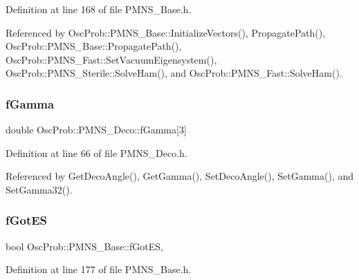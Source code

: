 Definition at line 168 of file P\+M\+N\+S\+\_\+\+Base.\+h.



Referenced by Osc\+Prob\+::\+P\+M\+N\+S\+\_\+\+Base\+::\+Initialize\+Vectors(), Propagate\+Path(), Osc\+Prob\+::\+P\+M\+N\+S\+\_\+\+Base\+::\+Propagate\+Path(), Osc\+Prob\+::\+P\+M\+N\+S\+\_\+\+Fast\+::\+Set\+Vacuum\+Eigensystem(), Osc\+Prob\+::\+P\+M\+N\+S\+\_\+\+Sterile\+::\+Solve\+Ham(), and Osc\+Prob\+::\+P\+M\+N\+S\+\_\+\+Fast\+::\+Solve\+Ham().

\mbox{\label{classOscProb_1_1PMNS__Deco_ae2f30ac9f8b25344959f1698616d337a}} 
\subsubsection{\texorpdfstring{f\+Gamma}{fGamma}}
{\footnotesize\ttfamily double Osc\+Prob\+::\+P\+M\+N\+S\+\_\+\+Deco\+::f\+Gamma\mbox{[}3\mbox{]}\hspace{0.3cm}{\ttfamily [protected]}}



Definition at line 66 of file P\+M\+N\+S\+\_\+\+Deco.\+h.



Referenced by Get\+Deco\+Angle(), Get\+Gamma(), Set\+Deco\+Angle(), Set\+Gamma(), and Set\+Gamma32().

\mbox{\label{classOscProb_1_1PMNS__Base_a6dc5cd010d2d70b2324745b4e53e9839}} 
\subsubsection{\texorpdfstring{f\+Got\+ES}{fGotES}}
{\footnotesize\ttfamily bool Osc\+Prob\+::\+P\+M\+N\+S\+\_\+\+Base\+::f\+Got\+ES\hspace{0.3cm}{\ttfamily [protected]}, {\ttfamily [inherited]}}



Definition at line 177 of file P\+M\+N\+S\+\_\+\+Base.\+h.



